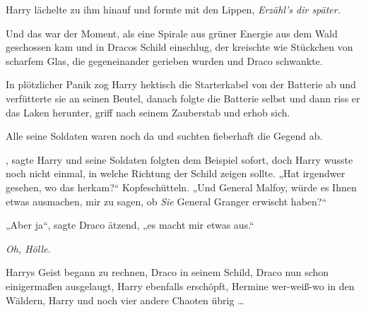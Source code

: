 Harry lächelte zu ihm hinauf und formte mit den Lippen, \emph{Erzähl’s dir später.}

Und das war der Moment, als eine Spirale aus grüner Energie aus dem Wald geschossen kam und in Dracos Schild einschlug, der kreischte wie Stückchen von scharfem Glas, die gegeneinander gerieben wurden und Draco schwankte.

In plötzlicher Panik zog Harry hektisch die Starterkabel von der Batterie ab und verfütterte sie an seinen Beutel, danach folgte die Batterie selbst und dann riss er das Laken herunter, griff nach seinem Zauberstab und erhob sich.

Alle seine Soldaten waren noch da und suchten fieberhaft die Gegend ab.

, sagte Harry und seine Soldaten folgten dem Beispiel sofort, doch Harry wusste noch nicht einmal, in welche Richtung der Schild zeigen sollte.
„Hat irgendwer gesehen, wo das herkam?“ Kopfeschütteln.
„Und General Malfoy, würde es Ihnen etwas ausmachen, mir zu sagen, ob \emph{Sie} General Granger erwischt haben?“

„Aber ja“, sagte Draco ätzend, „es macht mir etwas aus.“

\emph{Oh, Hölle.}

Harrys Geist begann zu rechnen, Draco in seinem Schild, Draco nun schon einigermaßen ausgelaugt, Harry ebenfalls erschöpft, Hermine wer-weiß-wo in den Wäldern, Harry und noch vier andere Chaoten übrig …

